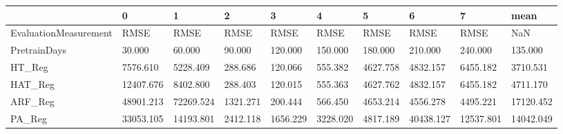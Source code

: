 \begin{tabular}{llllllllll}
\toprule
{} &         0 &         1 &        2 &        3 &        4 &        5 &         6 &         7 &      mean \\
\midrule
EvaluationMeasurement &      RMSE &      RMSE &     RMSE &     RMSE &     RMSE &     RMSE &      RMSE &      RMSE &       NaN \\
PretrainDays          &    30.000 &    60.000 &   90.000 &  120.000 &  150.000 &  180.000 &   210.000 &   240.000 &   135.000 \\
HT\_Reg                &  7576.610 &  5228.409 &  288.686 &  120.066 &  555.382 & 4627.758 &  4832.157 &  6455.182 &  3710.531 \\
HAT\_Reg               & 12407.676 &  8402.800 &  288.403 &  120.015 &  555.363 & 4627.762 &  4832.157 &  6455.182 &  4711.170 \\
ARF\_Reg               & 48901.213 & 72269.524 & 1321.271 &  200.444 &  566.450 & 4653.214 &  4556.278 &  4495.221 & 17120.452 \\
PA\_Reg                & 33053.105 & 14193.801 & 2412.118 & 1656.229 & 3228.020 & 4817.189 & 40438.127 & 12537.801 & 14042.049 \\
\bottomrule
\end{tabular}
